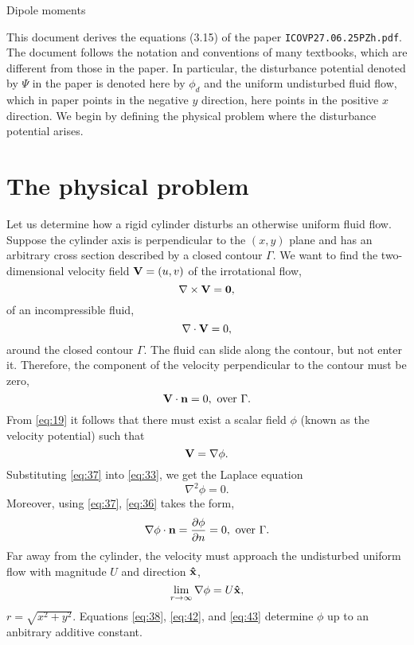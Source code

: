 \documentclass[11pt]{article}
\begin{document}
\begin{center}
{\Large Dipole moments}
\end{center}
This document derives the equations (3.15) of the paper {\tt ICOVP27.06.25PZh.pdf}. The document follows the notation and conventions of many textbooks, which are different from those in the paper. In particular, the disturbance potential denoted by $\Psi$ in the paper is denoted here by $\phi_d$ and the uniform undisturbed fluid flow, which in paper points in the negative $y$ direction, here points in the positive $x$ direction. We begin by defining the physical problem where the disturbance potential arises.

\section{The physical problem}
Let us determine how a rigid cylinder disturbs an otherwise uniform fluid flow. Suppose the cylinder axis is perpendicular to the $(x,y)$ plane and has an arbitrary cross section described by a closed contour $\Gamma$. We want to find the two-dimensional velocity field ${\bf V}=(u,v)$ of the irrotational flow,
\begin{equation}
  \label{eq:19}
  \nabla \times {\bf V} = {\bf 0},
\end{equation}
of an incompressible fluid,
\begin{equation}
  \label{eq:33}
  \nabla \cdot {\bf V} = 0,
\end{equation}
around the closed contour $\Gamma$. The fluid can slide along the contour, but not enter it. Therefore, the component of the velocity perpendicular to the contour must be zero,
\begin{equation}
  \label{eq:36}
  {\bf V}\cdot{\bf n} = 0,~\mathrm{over}~\Gamma.
\end{equation}
From \eqref{eq:19} it follows that there must exist a scalar field $\phi$ (known as the velocity potential) such that
\begin{equation}
  \label{eq:37}
  {\bf V} = \nabla\phi.
\end{equation}
Substituting \eqref{eq:37} into \eqref{eq:33}, we get the Laplace equation
\begin{equation}
  \label{eq:38}
  \nabla^2\phi = 0.
\end{equation}
Moreover, using \eqref{eq:37}, \eqref{eq:36} takes the form,
\begin{equation}
  \label{eq:42}
  \nabla\phi\cdot{\bf n} = \frac{\partial\phi}{\partial n} = 0,~\mathrm{over}~\Gamma.
\end{equation}
Far away from the cylinder, the velocity must approach the undisturbed uniform flow with magnitude $U$ and direction ${\bf\hat{x}}$,
\begin{equation}
  \label{eq:43}
\lim_{r\rightarrow\infty} \nabla\phi = U{\bf\hat{x}},
\end{equation}
$r = \sqrt{x^2 + y^2}$.
Equations \eqref{eq:38}, \eqref{eq:42}, and \eqref{eq:43} determine $\phi$ up to an anbitrary additive constant.
\end{document}
